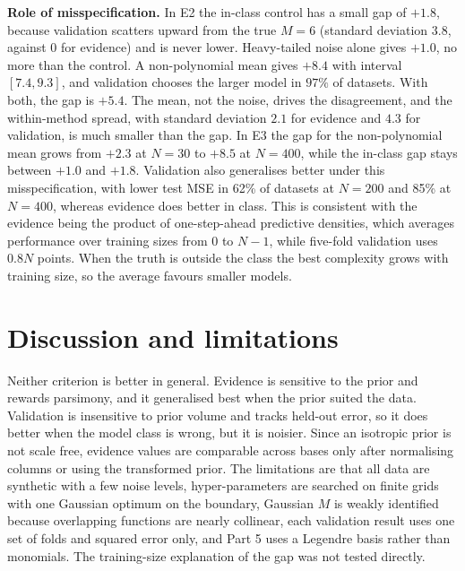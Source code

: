 \documentclass[10pt,a4paper]{article}
\begin{document}
\textbf{Role of misspecification.} In E2 the in-class control has a small gap of $+1.8$, because validation scatters upward from the true $M=6$ (standard deviation $3.8$, against $0$ for evidence) and is never lower. Heavy-tailed noise alone gives $+1.0$, no more than the control. A non-polynomial mean gives $+8.4$ with interval $[7.4,9.3]$, and validation chooses the larger model in $97\%$ of datasets. With both, the gap is $+5.4$. The mean, not the noise, drives the disagreement, and the within-method spread, with standard deviation $2.1$ for evidence and $4.3$ for validation, is much smaller than the gap. In E3 the gap for the non-polynomial mean grows from $+2.3$ at $N=30$ to $+8.5$ at $N=400$, while the in-class gap stays between $+1.0$ and $+1.8$. Validation also generalises better under this misspecification, with lower test MSE in 62\% of datasets at $N=200$ and 85\% at $N=400$, whereas evidence does better in class. This is consistent with the evidence being the product of one-step-ahead predictive densities, which averages performance over training sizes from $0$ to $N-1$, while five-fold validation uses $0.8N$ points. When the truth is outside the class the best complexity grows with training size, so the average favours smaller models.

\section{Discussion and limitations}
Neither criterion is better in general. Evidence is sensitive to the prior and rewards parsimony, and it generalised best when the prior suited the data. Validation is insensitive to prior volume and tracks held-out error, so it does better when the model class is wrong, but it is noisier. Since an isotropic prior is not scale free, evidence values are comparable across bases only after normalising columns or using the transformed prior. The limitations are that all data are synthetic with a few noise levels, hyper-parameters are searched on finite grids with one Gaussian optimum on the boundary, Gaussian $M$ is weakly identified because overlapping functions are nearly collinear, each validation result uses one set of folds and squared error only, and Part 5 uses a Legendre basis rather than monomials. The training-size explanation of the gap was not tested directly.
\end{document}
